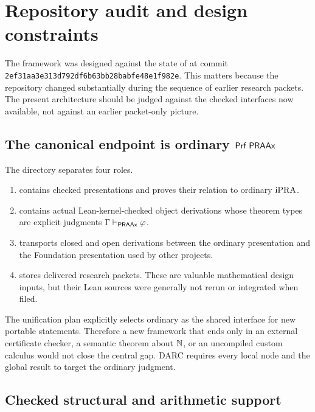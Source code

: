 \section{Repository audit and design constraints}
\label{sec:audit}

The framework was designed against the state of
 at commit
\texttt{2ef31aa3e313d792df6b63bb28babfe48e1f982e}.  This matters because the
repository changed substantially during the sequence of earlier research
packets.  The present architecture should be judged against the checked
interfaces now available, not against an earlier packet-only picture.

\subsection{The canonical endpoint is ordinary \texorpdfstring{\(\mathsf{Prf}\;\mathsf{PRAAx}\)}{Prf PRAAx}}

The directory  separates four
roles.
\begin{enumerate}
  \item {} contains checked presentations and proves their
        relation to ordinary \(\mathrm{iPRA}\).
  \item {} contains actual Lean-kernel-checked object
        derivations whose theorem types are explicit judgments
        \(\Gamma\vdash_{\mathsf{PRAAx}}\varphi\).
  \item {} transports closed and open derivations between the
        ordinary presentation and the Foundation presentation used by other
        projects.
  \item {} stores delivered research packets.  These are
        valuable mathematical design inputs, but their Lean sources were
        generally not rerun or integrated when filed.
\end{enumerate}
The unification plan explicitly selects ordinary  as the
shared interface for new portable statements.  Therefore a new framework that
ends only in an external certificate checker, a semantic theorem about
\(\mathbb{N}\), or an uncompiled custom calculus would not close the central gap.
DARC requires every local node and the global result to target the ordinary
judgment.

\subsection{Checked structural and arithmetic support}

